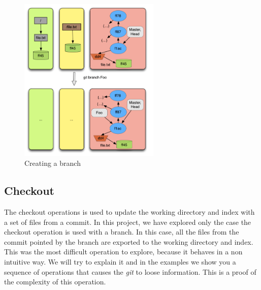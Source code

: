 \begin{figure}[!t]
   \centering
   \includegraphics[width=0.6\textwidth]{images/branch.png}
   \caption{Creating a branch}\label{fig:branch}
\end{figure}

\subsection{Checkout}
The checkout operations is used to update the working directory and
index with a set of files from a commit. In this project, we have
explored only the case the checkout operation is used with a branch.
In this case, all the files from the commit pointed by the branch are
exported to the working directory and index. This was the most
difficult operation to explore, because it behaves in a non intuitive
way. We will try to explain it and in the examples we show you a
sequence of operations that causes the \emph{git} to loose
information. This is a proof of the complexity of this operation.

